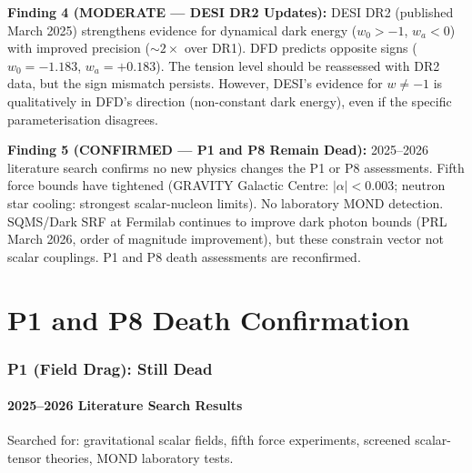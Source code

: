 \documentclass[11pt]{article}
\begin{document}
\begin{tcolorbox}[colback=red!5!white, colframe=red!60!black,
  title=\textbf{TOP 5 FINDINGS --- W4i10}]
\textbf{Finding 4 (MODERATE --- DESI DR2 Updates):} DESI DR2
(published March 2025) strengthens evidence for dynamical dark energy
($w_0 > -1$, $w_a < 0$) with improved precision ($\sim 2\times$ over
DR1). DFD predicts opposite signs ($w_0 = -1.183$, $w_a = +0.183$).
The tension level should be reassessed with DR2 data, but the
sign mismatch persists. However, DESI's evidence for
$w \neq -1$ is qualitatively in DFD's direction (non-constant dark
energy), even if the specific parameterisation disagrees.

\textbf{Finding 5 (CONFIRMED --- P1 and P8 Remain Dead):} 2025--2026
literature search confirms no new physics changes the P1 or P8
assessments. Fifth force bounds have tightened (GRAVITY Galactic Centre:
$|\alpha| < 0.003$; neutron star cooling: strongest scalar-nucleon
limits). No laboratory MOND detection. SQMS/Dark SRF at Fermilab
continues to improve dark photon bounds (PRL March 2026, order of
magnitude improvement), but these constrain vector not scalar couplings.
P1 and P8 death assessments are reconfirmed.
\end{tcolorbox}


\part{P1 and P8 Death Confirmation}

\section{P1 (Field Drag): Still Dead}

\subsection{2025--2026 Literature Search Results}

Searched for: gravitational scalar fields, fifth force experiments,
screened scalar-tensor theories, MOND laboratory tests.
\end{document}
